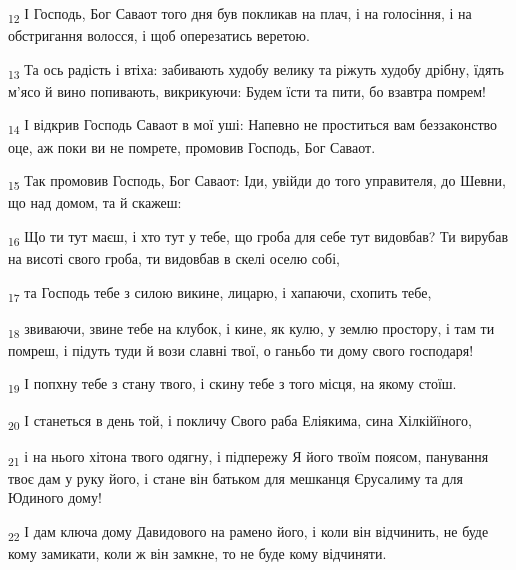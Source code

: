 \begin{tcolorbox}
\textsubscript{12} І Господь, Бог Саваот того дня був покликав на плач, і на голосіння, і на обстригання волосся, і щоб оперезатись веретою.
\end{tcolorbox}
\begin{tcolorbox}
\textsubscript{13} Та ось радість і втіха: забивають худобу велику та ріжуть худобу дрібну, їдять м'ясо й вино попивають, викрикуючи: Будем їсти та пити, бо взавтра помрем!
\end{tcolorbox}
\begin{tcolorbox}
\textsubscript{14} І відкрив Господь Саваот в мої уші: Напевно не проститься вам беззаконство оце, аж поки ви не помрете, промовив Господь, Бог Саваот.
\end{tcolorbox}
\begin{tcolorbox}
\textsubscript{15} Так промовив Господь, Бог Саваот: Іди, увійди до того управителя, до Шевни, що над домом, та й скажеш:
\end{tcolorbox}
\begin{tcolorbox}
\textsubscript{16} Що ти тут маєш, і хто тут у тебе, що гроба для себе тут видовбав? Ти вирубав на висоті свого гроба, ти видовбав в скелі оселю собі,
\end{tcolorbox}
\begin{tcolorbox}
\textsubscript{17} та Господь тебе з силою викине, лицарю, і хапаючи, схопить тебе,
\end{tcolorbox}
\begin{tcolorbox}
\textsubscript{18} звиваючи, звине тебе на клубок, і кине, як кулю, у землю простору, і там ти помреш, і підуть туди й вози славні твої, о ганьбо ти дому свого господаря!
\end{tcolorbox}
\begin{tcolorbox}
\textsubscript{19} І попхну тебе з стану твого, і скину тебе з того місця, на якому стоїш.
\end{tcolorbox}
\begin{tcolorbox}
\textsubscript{20} І станеться в день той, і покличу Свого раба Еліякима, сина Хілкійїного,
\end{tcolorbox}
\begin{tcolorbox}
\textsubscript{21} і на нього хітона твого одягну, і підпережу Я його твоїм поясом, панування твоє дам у руку його, і стане він батьком для мешканця Єрусалиму та для Юдиного дому!
\end{tcolorbox}
\begin{tcolorbox}
\textsubscript{22} І дам ключа дому Давидового на рамено його, і коли він відчинить, не буде кому замикати, коли ж він замкне, то не буде кому відчиняти.
\end{tcolorbox}
